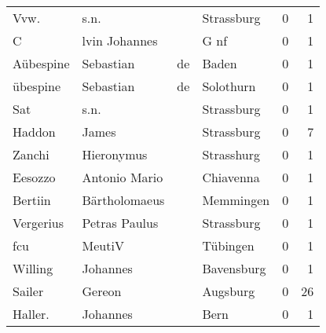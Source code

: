 \begin{center}
\begin{tiny}
\begin{longtabu}{llllrr}
                     Vvw. &                               s.n. &             &                                  Strassburg &          0 &         1 \\
                        C &                      lvin Johannes &             &                                        G nf &          0 &         1 \\
                Aübespine &                          Sebastian &          de &                                       Baden &          0 &         1 \\
                 übespine &                          Sebastian &          de &                                   Solothurn &          0 &         1 \\
                      Sat &                               s.n. &             &                                  Strassburg &          0 &         1 \\
                   Haddon &                              James &             &                                  Strassburg &          0 &         7 \\
                   Zanchi &                         Hieronymus &             &                                  Strasshurg &          0 &         1 \\
                  Eesozzo &                      Antonio Mario &             &                                   Chiavenna &          0 &         1 \\
                  Bertiin &                      Bärtholomaeus &             &                                   Memmingen &          0 &         1 \\
                Vergerius &                      Petras Paulus &             &                                  Strassburg &          0 &         1 \\
                      fcu &                             MeutiV &             &                                    Tübingen &          0 &         1 \\
                  Willing &                           Johannes &             &                                  Bavensburg &          0 &         1 \\
                   Sailer &                             Gereon &             &                                    Augsburg &          0 &        26 \\
                  Haller. &                           Johannes &             &                                        Bern &          0 &         1 \\

\end{longtabu}
\end{tiny}
\end{center}
